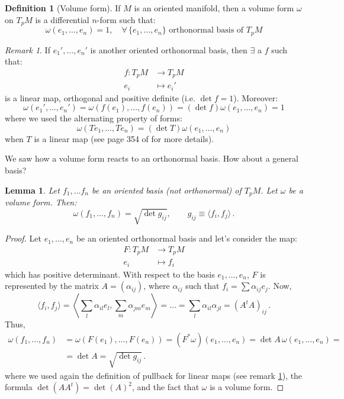 \documentclass[a4paper,11pt,titlepage, article, oneside]{memoir}
\numberwithin{equation}{section}
\newtheorem{lemma}[theorem]{Lemma}
\theoremstyle{definition}
\newtheorem{definition}[theorem]{Definition}
\theoremstyle{remark}
\newtheorem{remark}[theorem]{Remark}
\begin{document}
\begin{definition}[Volume form]
If $M$ is an oriented manifold, then a volume form $\omega$ on $T_pM$ is a  differential $n$-form such that:
\begin{equation}
\omega(e_1, \ldots, e_n) = 1, \quad \forall\, \{e_1, \ldots, e_n\} \text{ orthonormal basis of }T_pM
\end{equation}
\end{definition}

\begin{remarkbox}\begin{remark} \label{diffbasisrem}
If $e_1', \ldots, e_n'$ is another oriented orthonormal basis, then $\exists$ a $f$ such that:
\begin{align*}
f \colon T_pM &\rightarrow T_p M \\
e_i &\mapsto e_i'
\end{align*}
is a linear map, orthogonal and positive definite (i.e. $\det f = 1$). Moreover:
$$\omega(e_1', \ldots, e_n') = \omega(f(e_1), \ldots, f(e_n))  = (\det f) \omega(e_1, \ldots, e_n) =1$$
where we used the alternating property of forms: 
\[ \omega (T e_1, \ldots, T e_n) = (\det T) \omega(e_1, \ldots, e_n) \] when $T$ is a linear map (see page 354 of  for more details).
\end{remark}\end{remarkbox}
We saw how a volume form reacts to an orthonormal basis. How about a general basis?

\begin{lemma}
Let $f_1, \ldots f_n$ be an oriented basis (not orthonormal) of $T_p M$. Let $\omega$ be a volume form. Then:
\begin{equation}
\omega(f_1, \ldots, f_n)=\sqrt{\det g_{ij}}, \qquad g_{ij} \equiv \langle f_i, f_j \rangle  \, .
\end{equation}
\end{lemma}
\begin{proof}
Let $e_1, \ldots, e_n$ be an oriented orthonormal basis and let's consider the map:
\begin{align*}
F \colon T_pM &\rightarrow T_p M \\
e_i &\mapsto f_i
\end{align*}
which has positive determinant. With respect to the basis $e_1, \ldots, e_n$, $F$ is represented by the matrix $A=(\alpha_{ij})$, where $\alpha_{ij}$ such that $f_i = \sum \alpha_{ij} e_j$. Now,
$$\langle f_i, f_j \rangle = \left \langle \sum\limits_l \alpha_{il} e_l, \sum\limits_m \alpha_{jm}e_m \right \rangle = \ldots= \sum\limits_l \alpha_{il}\alpha_{jl} = \left( A^t A \right )_{ij} \, .$$
Thus,
\begin{align*}
\omega(f_1, \ldots, f_n) &= \omega(F(e_1), \ldots, F(e_n)) = (F^* \omega)(e_1, \ldots, e_n)= \det A \, \omega(e_1, \ldots, e_n) =\\
&= \det A = \sqrt{\det g_{ij}} \, .
\end{align*}
where we used again the definition of pullback for linear maps (see remark \ref{diffbasisrem}), the formula $\det(A A^t) = \det(A)^2$, and the fact that $\omega$ is a volume form.
\end{proof}
\end{document}
